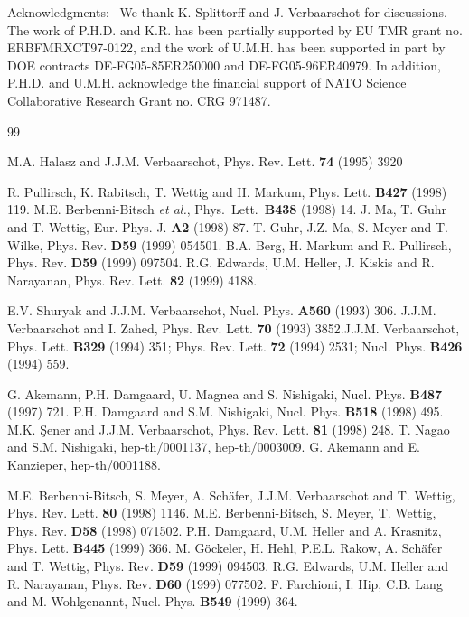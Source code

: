 \documentclass[11pt]{article}
\newcommand{\noi}{\vspace{12pt}\noindent}
\begin{document}
\noi
{\sc Acknowledgments:}~ We thank K. Splittorff and J. Verbaarschot
for discussions.
The work of P.H.D. and K.R. has been partially 
supported by EU TMR grant no. ERBFMRXCT97-0122, and the work of U.M.H.
has been supported in part by DOE contracts DE-FG05-85ER250000 and
DE-FG05-96ER40979. In addition, P.H.D. and U.M.H. acknowledge the financial
support of NATO Science Collaborative Research Grant no. CRG 971487.
 

\begin{thebibliography}{99}

M.A. Halasz and J.J.M. Verbaarschot,
Phys. Rev. Lett.  {\bf 74} (1995) 3920

R. Pullirsch, K. Rabitsch, T. Wettig and H. Markum,
Phys. Lett.  {\bf B427} (1998) 119. \newline
M.E. Berbenni-Bitsch {\it et al.},
Phys.\ Lett.\  {\bf B438} (1998) 14. \newline
J. Ma, T. Guhr and T. Wettig,
Eur. Phys. J.  {\bf A2} (1998) 87. \newline
T. Guhr, J.Z. Ma, S. Meyer and T. Wilke,
Phys. Rev.  {\bf D59} (1999) 054501. \newline
B.A. Berg, H. Markum and R. Pullirsch,
Phys. Rev.  {\bf D59} (1999) 097504. \newline
R.G. Edwards, U.M. Heller, J. Kiskis and R. Narayanan,
Phys. Rev. Lett.  {\bf 82} (1999) 4188.

E.V. Shuryak and J.J.M. Verbaarschot, Nucl. Phys. {\bf A560}
(1993) 306. 
J.J.M. Verbaarschot and I. Zahed, Phys. Rev. Lett. {\bf 70}
(1993) 3852.\newline J.J.M. Verbaarschot,
Phys. Lett. {\bf B329} (1994) 351; Phys. Rev. Lett. {\bf 72} (1994) 2531;
Nucl. Phys. {\bf B426} (1994) 559.

G. Akemann, P.H. Damgaard, U. Magnea and S. Nishigaki,
Nucl. Phys. {\bf B487} (1997) 721. \newline
P.H. Damgaard and S.M. Nishigaki, Nucl. Phys. {\bf B518} (1998) 495. \newline
M.K. \c{S}ener and J.J.M. Verbaarschot, Phys. Rev. Lett. {\bf 81} (1998) 248.
\newline
T. Nagao and S.M. Nishigaki, hep-th/0001137, hep-th/0003009.\newline
G. Akemann and E. Kanzieper, hep-th/0001188.

M.E. Berbenni-Bitsch, S. Meyer, A. Sch\"{a}fer,
J.J.M. Verbaarschot and T. Wettig,  Phys. Rev. Lett. {\bf 80} (1998) 1146.
\newline M.E. Berbenni-Bitsch, S. Meyer, T. Wettig, 
Phys. Rev. {\bf D58} (1998) 071502. \newline
P.H. Damgaard, U.M. Heller and A. Krasnitz, Phys. Lett. 
{\bf B445} (1999) 366.
\newline M. G\"{o}ckeler, H. Hehl, P.E.L. Rakow, A. Sch\"{a}fer and T. Wettig,
 Phys. Rev. {\bf D59} (1999) 094503. 
R.G. Edwards, U.M. Heller and R. Narayanan, Phys. Rev. {\bf D60} (1999) 077502.
\newline F. Farchioni, I. Hip, C.B. Lang and M. Wohlgenannt,
Nucl. Phys. {\bf B549} (1999) 364. 


\end{thebibliography}
\end{document}
